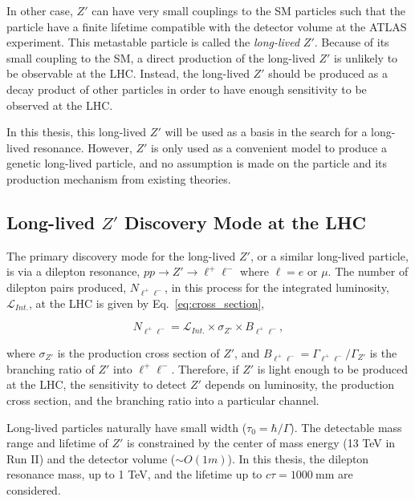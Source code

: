 In other case, $Z'$ can have very small couplings to the SM particles such that the particle have a finite lifetime compatible with the detector volume at the ATLAS experiment. This metastable particle is called the \textit{long-lived} $Z'$. Because of its small coupling to the SM, a direct production of the long-lived $Z'$ is unlikely to be observable at the LHC. Instead, the long-lived $Z'$ should be produced as a decay product of other particles in order to have enough sensitivity to be observed at the LHC. 

In this thesis, this long-lived $Z'$ will be used as a basis in the search for a long-lived resonance. However, $Z'$ is only used as a convenient model to produce a genetic long-lived particle, and no assumption is made on the particle and its production mechanism from existing theories.


\subsection{Long-lived \texorpdfstring{$Z'$}{Z'} Discovery Mode at the LHC}
\label{sec:intro:zprime_discovery}

The primary discovery mode for the long-lived $Z'$, or a similar long-lived particle, is via a dilepton resonance, $pp \rightarrow Z' \rightarrow  \ell^{+}\ell^{-}$ where $\ell= e$ or $\mu$. The number of dilepton pairs produced, $N_{\ell^{+}\ell^{-}}$, in this process for the integrated luminosity, $\mathcal{L}_{Int.}$, at the LHC is given by Eq.~\ref{eq:cross_section},

\begin{equation}
\label{eq:cross_section}
N_{\ell^{+}\ell^{-}} = \mathcal{L}_{Int.} \times \sigma_{Z'} \times B_{\ell^{+}\ell^{-}},
\end{equation}

where $\sigma_{Z'}$ is the production cross section of $Z'$, and $B_{\ell^{+}\ell^{-}} = \Gamma_{\ell^{+}\ell^{-}} / \Gamma_{Z'}$ is the branching ratio of $Z'$ into $\ell^{+}\ell^{-}$. Therefore, if $Z'$ is light enough to be produced at the LHC, the sensitivity to detect $Z'$ depends on luminosity, the production cross section, and the branching ratio into a particular channel.

Long-lived particles naturally have small width ($\tau_{0} = \hbar / \Gamma$). The detectable mass range and lifetime of $Z'$ is constrained by the center of mass energy (13 TeV in Run II) and the detector volume ($\sim O(1m)$). In this thesis, the dilepton resonance mass, up to 1 TeV, and the lifetime up to $c\tau= 1000~\si{\mm}$ are considered.

